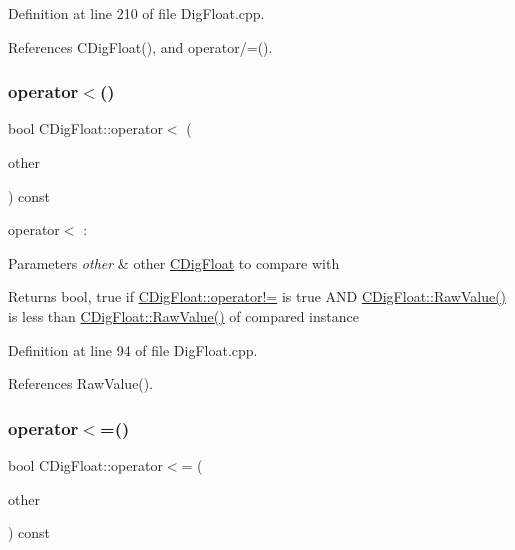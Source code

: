 Definition at line 210 of file Dig\+Float.\+cpp.



References C\+Dig\+Float(), and operator/=().

\mbox{\label{classCDigFloat_a159ef0b911dfba94ea468c36167c3a42}} 
\subsubsection{\texorpdfstring{operator$<$()}{operator<()}}
{\footnotesize\ttfamily bool C\+Dig\+Float\+::operator$<$ (\begin{DoxyParamCaption}\item[{const \hyperlink{classCDigFloat}{C\+Dig\+Float} \&}]{other }\end{DoxyParamCaption}) const}



operator$<$ \+: 


\begin{DoxyParams}{Parameters}
{\em other} & other \hyperlink{classCDigFloat}{C\+Dig\+Float} to compare with \\
\hline
\end{DoxyParams}
\begin{DoxyReturn}{Returns}
bool, true if \hyperlink{classCDigFloat_a15c13c035aff8184491bd9629403a33a}{C\+Dig\+Float\+::operator!=} is true A\+ND \hyperlink{classCDigFloat_acb435346b1f7b2e78d8f8373a416533a}{C\+Dig\+Float\+::\+Raw\+Value()} is less than \hyperlink{classCDigFloat_acb435346b1f7b2e78d8f8373a416533a}{C\+Dig\+Float\+::\+Raw\+Value()} of compared instance 
\end{DoxyReturn}


Definition at line 94 of file Dig\+Float.\+cpp.



References Raw\+Value().

\mbox{\label{classCDigFloat_a0c49ab029c7f0c610db1d29425353558}} 
\subsubsection{\texorpdfstring{operator$<$=()}{operator<=()}}
{\footnotesize\ttfamily bool C\+Dig\+Float\+::operator$<$= (\begin{DoxyParamCaption}\item[{const \hyperlink{classCDigFloat}{C\+Dig\+Float} \&}]{other }\end{DoxyParamCaption}) const}



